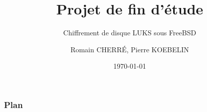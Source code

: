 \documentclass{beamer}
\title[Short title]{Projet de fin d'étude} %
\subtitle{Chiffrement de disque LUKS sous FreeBSD}
\author{Romain CHERRÉ, Pierre KOEBELIN} %
\date{\today} %
\begin{document}
\begin{frame}
  \titlepage %
\end{frame}

\begin{frame}
  \frametitle{Plan} %
  \tableofcontents %
\end{frame}













\end{document}
